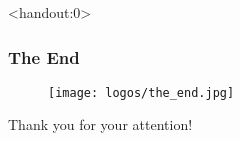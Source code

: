 \documentclass[english,xcolor=pdftex,dvipsnames,aspectratio=<+++ if course.aspectratio is defined +++><++course.aspectratio++><+++else+++>43<+++endif+++>]{beamer}
\begin{document}
%

%  

\begin{frame}<handout:0> 
	\frametitle{The End}
	\begin{center}
		\begin{figure}
			\centering
			
			\texttt{[image: logos/the\_end.jpg]}
		\end{figure}
		Thank you for your attention!
	\end{center}
\end{frame}
\end{document}
